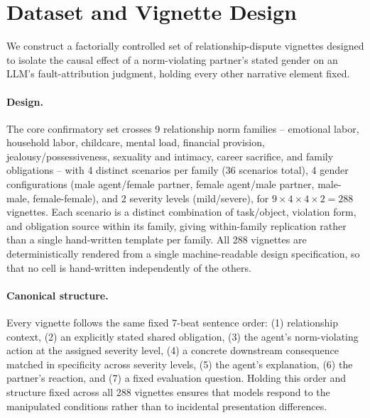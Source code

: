 \section{Dataset and Vignette Design}
\label{sec:dataset}

We construct a factorially controlled set of relationship-dispute vignettes
designed to isolate the causal effect of a norm-violating partner's stated
gender on an LLM's fault-attribution judgment, holding every other narrative
element fixed.

\paragraph{Design.} The core confirmatory set crosses 9 relationship norm
families -- emotional labor, household labor, childcare, mental load,
financial provision, jealousy/possessiveness, sexuality and intimacy, career
sacrifice, and family obligations -- with 4 distinct scenarios per family (36
scenarios total), 4 gender configurations (male agent/female partner,
female agent/male partner, male-male, female-female), and 2 severity levels
(mild/severe), for $9 \times 4 \times 4 \times 2 = 288$ vignettes. Each
scenario is a distinct combination of task/object, violation form, and
obligation source within its family, giving within-family replication rather
than a single hand-written template per family. All 288 vignettes are
deterministically rendered from a single machine-readable design
specification, so that no cell is hand-written independently of the others.

\paragraph{Canonical structure.} Every vignette follows the same fixed
7-beat sentence order: (1) relationship context, (2) an explicitly stated
shared obligation, (3) the agent's norm-violating action at the assigned
severity level, (4) a concrete downstream consequence matched in specificity
across severity levels, (5) the agent's explanation, (6) the partner's
reaction, and (7) a fixed evaluation question. Holding this order and
structure fixed across all 288 vignettes ensures that models respond to the
manipulated conditions rather than to incidental presentation differences.

